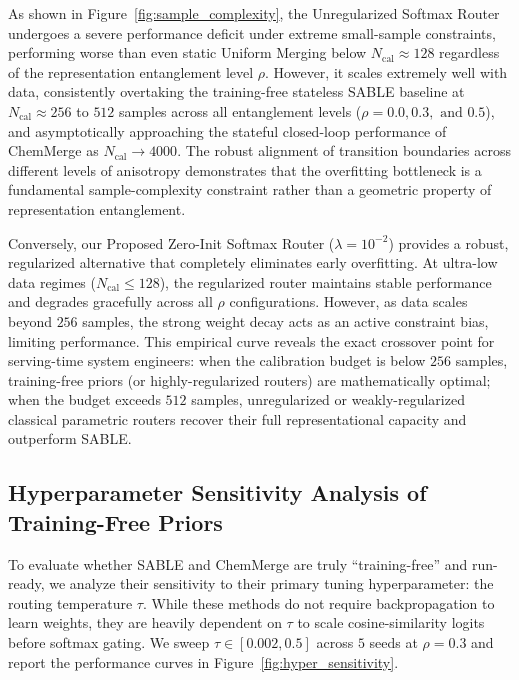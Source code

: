 As shown in Figure~\ref{fig:sample_complexity}, the Unregularized Softmax Router undergoes a severe performance deficit under extreme small-sample constraints, performing worse than even static Uniform Merging below $N_{\text{cal}} \approx 128$ regardless of the representation entanglement level $\rho$. However, it scales extremely well with data, consistently overtaking the training-free stateless SABLE baseline at $N_{\text{cal}} \approx 256$ to $512$ samples across all entanglement levels ($\rho = 0.0, 0.3, \text{ and } 0.5$), and asymptotically approaching the stateful closed-loop performance of ChemMerge as $N_{\text{cal}} \to 4000$. The robust alignment of transition boundaries across different levels of anisotropy demonstrates that the overfitting bottleneck is a fundamental sample-complexity constraint rather than a geometric property of representation entanglement.

Conversely, our Proposed Zero-Init Softmax Router ($\lambda=10^{-2}$) provides a robust, regularized alternative that completely eliminates early overfitting. At ultra-low data regimes ($N_{\text{cal}} \le 128$), the regularized router maintains stable performance and degrades gracefully across all $\rho$ configurations. However, as data scales beyond $256$ samples, the strong weight decay acts as an active constraint bias, limiting performance. This empirical curve reveals the exact crossover point for serving-time system engineers: when the calibration budget is below $256$ samples, training-free priors (or highly-regularized routers) are mathematically optimal; when the budget exceeds $512$ samples, unregularized or weakly-regularized classical parametric routers recover their full representational capacity and outperform SABLE.

\subsection{Hyperparameter Sensitivity Analysis of Training-Free Priors}
\label{subsec:hyper_sensitivity}

To evaluate whether SABLE and ChemMerge are truly ``training-free'' and run-ready, we analyze their sensitivity to their primary tuning hyperparameter: the routing temperature $\tau$. While these methods do not require backpropagation to learn weights, they are heavily dependent on $\tau$ to scale cosine-similarity logits before softmax gating. We sweep $\tau \in [0.002, 0.5]$ across $5$ seeds at $\rho=0.3$ and report the performance curves in Figure~\ref{fig:hyper_sensitivity}.

